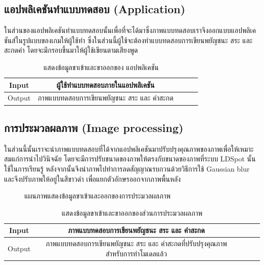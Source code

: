 \documentclass[12pt,oneside,openright,a4paper]{cpe-thai-project}
\begin{document}
\subsection{แอปพลิเคชันทำแบบทดสอบ (Application)}
ในส่วนของแอปพลิเคชันทำแบบทดสอบนั้นเพื่อที่จะได้มาซึ่งภาพแบบทดสอบเราจึงออกแบบแอปพลิเคชันส์ในรูปแบบของเกมให้ผู้ใช้ทำ ซึ่งในส่วนนี้ผู้ใช้จะต้องทำแบบทดสอบการเขียนพยัญชนะ สระ และสะกดคำ โดยจะมีกรอบขึ้นมาให้ผู้ใช้เขียนตามเสียงพูด 
\begin{table}[!h]\centering
  \caption{แสดงข้อมูลขาเข้าและขาออกของ แอปพลิเคชัน}\label{tbl:application1}
  \begin{tabular}{c|c|l|rr} \hline
  Input & ผู้ใช้ทำแบบทดสอบภายในแอปพลิเคชัน \\ \hline
  Output & ภาพแบบทดสอบการเขียนพยัญชนะ สระ และ คำสะกด \\ \hline
  \end{tabular}
  \end{table}

\subsection{การประมวลผลภาพ (Image processing)}
ในส่วนนี้นั้นเราจะนำภาพแบบทดสอบที่ได้จากแอปพลิเคชันมาปรับปรุงคุณภาพของภาพเพื่อให้เหมาะสมแก่การนำไปวินิจฉัย 
โดยจะมีการปรับขนาดของภาพให้ตรงกับขนาดของภาพที่ระบบ LDSpot นั้นใช้ในการเรียนรู้ หลังจากนั้นจึงนำภาพไปทำการลดสัญญาณรบกวนด้วยวิธีการใช้ 
Gaussian blur และจึงปรับภาพให้อยู่ในสีขาวดำ เพื่อแยกตัวอักษรออกจากภาพพื้นหลัง
\begin{figure}[!ht]\centering
  \setlength{\fboxrule}{0.2mm} %
  \setlength{\fboxsep}{1cm}
  \caption{แผนภาพแสดงข้อมูลขาเข้าและออกของการประมวลผลภาพ}\label{fig:system}
\end{figure}
\begin{table}[!h]\centering
  \caption{แสดงข้อมูลขาเข้าและขาออกของส่วนการประมวลผลภาพ}\label{tbl:application1}
  \begin{tabular}{c|c|l|rr} \hline
  Input & ภาพแบบทดสอบการเขียนพยัญชนะ สระ และ คำสะกด \\ \hline
  Output & ภาพแบบทดสอบการเขียนพยัญชนะ สระ และ คำสะกดที่ปรับปรุงคุณภาพสำหรับการทำโมเดลแล้ว \\ \hline
  \end{tabular}
  \end{table}
  
\end{document}
